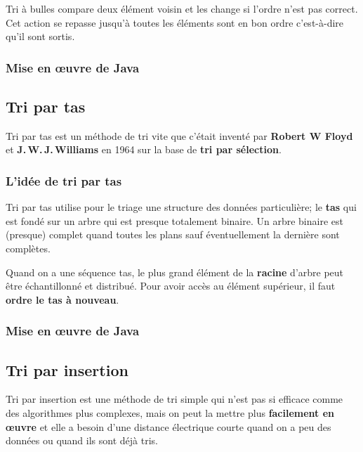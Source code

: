 \documentclass[11pt, a4paper, titlepage, twoside]{article}
\renewcommand{\emph}{\textbf}
\begin{document}
	Tri à bulles compare deux élément voisin et les change si l'ordre  n'est pas correct. Cet action se repasse jusqu'à toutes les éléments sont en bon ordre c'est-à-dire qu'il sont sortis.
	
	\subsubsection{Mise en œuvre de Java}
	
	
	
	\subsection{Tri par tas}
	
	Tri par tas est un méthode de tri vite que c'était inventé par \emph{Robert W Floyd} et \emph{J.\,W.\,J.\,Williams} en 1964 sur la base de \emph{tri par sélection}.
	
	\subsubsection{L'idée de tri par tas}
	
	Tri par tas utilise pour le triage une structure des données particulière; le \emph{tas} qui est fondé sur un arbre qui est presque totalement binaire. Un arbre binaire est (presque) complet quand toutes les  plans sauf éventuellement la dernière sont complètes.
	
	Quand on a une séquence tas, le plus grand élément de la \emph{racine} d'arbre peut être échantillonné et distribué. Pour avoir accès au élément supérieur, il faut \emph{ordre le tas à nouveau}.
	
	\subsubsection{Mise en œuvre de Java}
	
	
	
	\subsection{Tri par insertion}
	
	Tri par insertion est une méthode de tri simple qui n'est pas si efficace comme des algorithmes plus complexes, mais on peut la mettre plus \emph{facilement en œuvre} et elle a besoin d'une distance électrique courte quand on a peu des données ou quand ils sont déjà tris.
	
\end{document}

